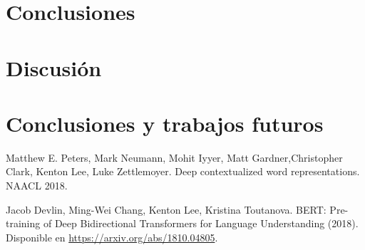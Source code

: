 \documentclass[conference]{IEEEtran}
\begin{document}
\section{Conclusiones}

\section{Discusión}

\section{Conclusiones y trabajos futuros}

\begin{thebibliography}{00}
Matthew E. Peters, Mark Neumann, Mohit Iyyer, 
Matt Gardner,Christopher Clark, Kenton Lee, Luke Zettlemoyer. 
Deep contextualized word representations. NAACL 2018.

Jacob Devlin, Ming-Wei Chang, Kenton Lee, 
Kristina Toutanova. 
BERT: Pre-training of Deep Bidirectional Transformers for Language Understanding (2018). 
Disponible en \href{https://arxiv.org/abs/1810.04805}{https://arxiv.org/abs/1810.04805}.

\end{thebibliography}
\end{document}
